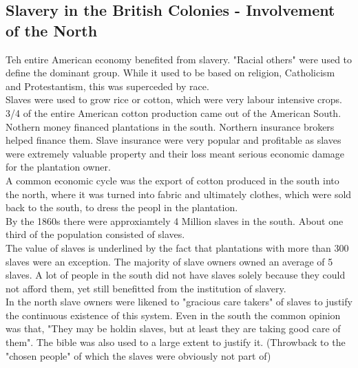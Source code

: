\documentclass{article}
\begin{document}
	\subsection{Slavery in the British Colonies - Involvement of the North}
	Teh entire American economy benefited from slavery. "Racial others" were used to define the dominant group. While it used to be based on religion, Catholicism and Protestantism, this was superceded by race. \\
	Slaves were used to grow rice or cotton, which were very labour intensive crops. 3/4 of the entire American cotton production came out of the American South. \\
	Nothern money financed plantations in the south. Northern insurance brokers helped finance them. Slave insurance were very popular and profitable as slaves were extremely valuable property and their loss meant serious economic damage for the plantation owner. \\
	A common economic cycle was the export of cotton produced in the south into the north, where it was turned into fabric and ultimately clothes, which were sold back to the south, to dress the peopl in the plantation. \\
	By the 1860s there were approxiamtely 4 Million slaves in the south. About one third of the population consisted of slaves. \\
	The value of slaves is underlined by the fact that plantations with more than 300 slaves were an exception. The majority of slave owners owned an average of 5 slaves. A lot of people in the south did not have slaves solely because they could not afford them, yet still benefitted from the institution of slavery. \\
	In the north slave owners were likened to "gracious care takers" of slaves to justify the continuous existence of this system. Even in the south the common opinion was that, "They may be holdin slaves, but at least they are taking good care of them". The bible was also used to a large extent to justify it. (Throwback to the "chosen people" of which the slaves were obviously not part of) \\
\end{document}
